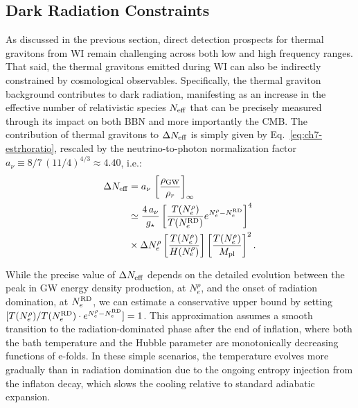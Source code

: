 \subsection{Dark Radiation Constraints}

As discussed in the previous section, direct detection prospects for thermal gravitons from WI remain challenging across both low and high frequency ranges. That said, the thermal gravitons emitted during WI can also be indirectly constrained by cosmological observables. Specifically, the thermal graviton background  contributes to dark radiation, manifesting as an increase in the effective number of relativistic species $N_{\rm eff}$ that can be precisely measured through its impact on both BBN and more importantly the CMB. The contribution of thermal gravitons to $\Delta N_{\rm eff}$ is simply given by Eq.~\eqref{eq:ch7-estrhoratio}, rescaled by the neutrino-to-photon normalization factor $a_\nu\equiv 8/7\,\left(11/4\right)^{4/3}\approx 4.40$, i.e.:
\begin{align}
    \Delta N_{\rm eff}&=a_\nu\, \left[\frac{\rho_{\rm GW}}{\rho_r}\right]_\infty \nonumber \\
    &\simeq
    \frac{4\, a_\nu}{g_{\star}}\left[\frac{T(N_e^{\rho})}{T(N_e^{\rm RD})}e^{N_e^{\rho}-N_e^{\rm RD}}\right]^4 \nonumber \\
   &\times\Delta N_{e}^{\rho}\left[\frac{T(N_e^{\rho})}{ H(N_e^{\rho})}\right]\left[\frac{T(N_e^{\rho})}{ M_{\rm pl}}\right]^2.
   \label{eq:ch7-estY2}
\end{align}

While the precise value of $\Delta N_{\rm eff}$ depends on the detailed evolution between the peak in GW energy density production, at $N_e^\rho$, and the onset of radiation domination, at $N_e^{\rm RD}$, we can estimate a conservative upper bound by setting $[T(N_e^{\rho})/T(N_e^{\rm RD})\cdot e^{N_e^{\rho}-N_e^{\rm RD}}]=1$. This approximation assumes a smooth transition to the radiation-dominated phase after the end of inflation, where both the bath temperature and the Hubble parameter are monotonically decreasing functions of e-folds. In these simple scenarios,  the temperature evolves more gradually than in radiation domination due to the ongoing entropy injection from the inflaton decay, which slows the cooling relative to standard adiabatic expansion.


